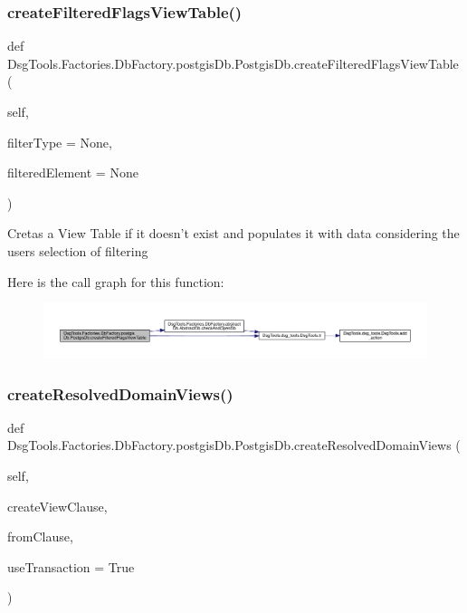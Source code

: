 \subsubsection{\texorpdfstring{create\+Filtered\+Flags\+View\+Table()}{createFilteredFlagsViewTable()}}
{\footnotesize\ttfamily def Dsg\+Tools.\+Factories.\+Db\+Factory.\+postgis\+Db.\+Postgis\+Db.\+create\+Filtered\+Flags\+View\+Table (\begin{DoxyParamCaption}\item[{}]{self,  }\item[{}]{filter\+Type = {\ttfamily None},  }\item[{}]{filtered\+Element = {\ttfamily None} }\end{DoxyParamCaption})}

\begin{DoxyVerb}Cretas a View Table if it doesn't exist and populates it
with data considering the users selection of filtering
\end{DoxyVerb}
 Here is the call graph for this function\+:
\nopagebreak
\begin{figure}[H]
\begin{center}
\leavevmode
\includegraphics[width=350pt]{class_dsg_tools_1_1_factories_1_1_db_factory_1_1postgis_db_1_1_postgis_db_a83a30c916b02c4ad03dc5dccd7f7e25a_cgraph}
\end{center}
\end{figure}
\mbox{\label{class_dsg_tools_1_1_factories_1_1_db_factory_1_1postgis_db_1_1_postgis_db_a7bd306d8b623d73e99e15206c8d64a48}} 
\subsubsection{\texorpdfstring{create\+Resolved\+Domain\+Views()}{createResolvedDomainViews()}}
{\footnotesize\ttfamily def Dsg\+Tools.\+Factories.\+Db\+Factory.\+postgis\+Db.\+Postgis\+Db.\+create\+Resolved\+Domain\+Views (\begin{DoxyParamCaption}\item[{}]{self,  }\item[{}]{create\+View\+Clause,  }\item[{}]{from\+Clause,  }\item[{}]{use\+Transaction = {\ttfamily True} }\end{DoxyParamCaption})}

